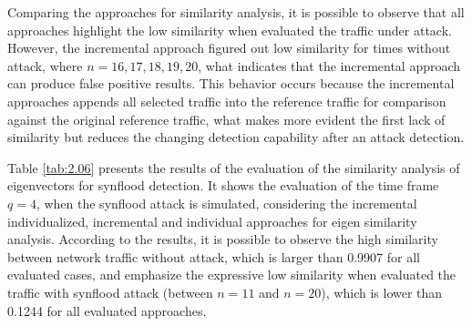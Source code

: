 Comparing the approaches for similarity analysis, it is possible to observe that all approaches highlight the low similarity when evaluated the traffic under attack. However, the incremental approach figured out low similarity for times without attack, where $n=16, 17, 18, 19, 20$, what indicates that the incremental approach can produce false positive results. This behavior occurs because the incremental approaches appends all selected traffic into the reference traffic for comparison against the original reference traffic, what makes more evident the first lack of similarity but reduces the changing detection capability after an attack detection.

Table \ref{tab:2.06} presents the results of the evaluation of the similarity analysis of eigenvectors for synflood detection. It shows the evaluation of the time frame $q=4$, when the synflood attack is simulated, considering the incremental individualized, incremental and individual approaches for eigen similarity analysis. According to the results, it is possible to observe the high similarity between network traffic without attack, which is larger than 0.9907 for all evaluated cases, and emphasize the expressive low similarity when evaluated the traffic with synflood attack (between $n=11$ and $n=20$), which is lower than 0.1244 for all evaluated approaches.

